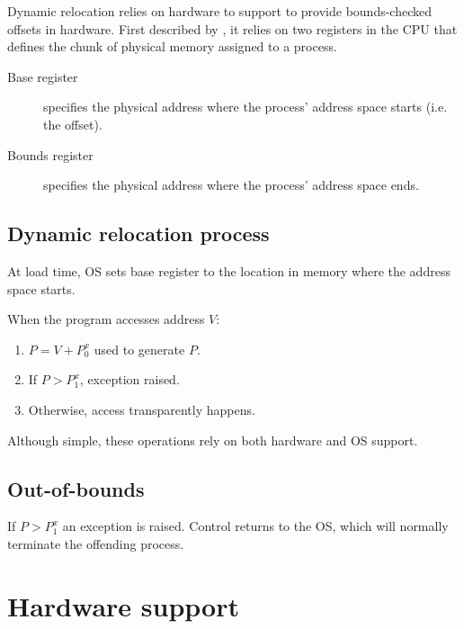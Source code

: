 Dynamic relocation relies on hardware to support to provide bounds-checked offsets in hardware.
First described by \citet{saltzer:1974:the-protection}, it relies on two registers in the CPU that defines the chunk of physical memory assigned to a process.

\begin{description}
\item[Base register] specifies the physical address where the process' address space starts (i.e. the offset).
\item[Bounds register] specifies the physical address where the process' address space ends.
\end{description}

\subsection{Dynamic relocation process}

At load time, OS sets base register to the location in memory where the address space starts.

When the program accesses address $V$:
\begin{enumerate}
\item $P=V+P_0^x$ used to generate $P$.
\item If $P>P^x_1$, exception raised.
\item Otherwise, access transparently happens.
\end{enumerate}

Although simple, these operations rely on both hardware and OS support.

\subsection{Out-of-bounds}

If $P>P^x_1$ an exception is raised.  Control returns to the OS, which will normally terminate the offending process.

\section{Hardware support}

